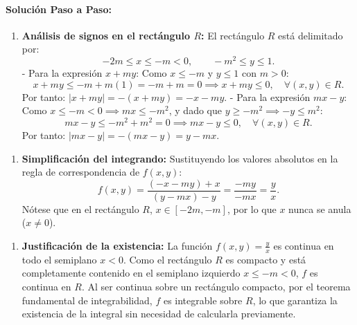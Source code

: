 \documentclass[11pt,a4paper]{article}
\begin{document}
\paragraph{Solución Paso a Paso:}\par
\begin{enumerate}[label=\textbf{\arabic*.}]
\item \textbf{Análisis de signos en el rectángulo $R$:}
El rectángulo $R$ está delimitado por:
\begin{equation*}
-2m \le x \le -m < 0, \qquad -m^2 \le y \le 1.
\end{equation*}
- Para la expresión $x + my$:
Como $x \le -m$ y $y \le 1$ con $m > 0$:
\begin{equation*}
x + my \le -m + m(1) = -m + m = 0 \implies x + my \le 0, \quad \forall (x,y) \in R.
\end{equation*}
Por tanto: $|x + my| = -(x + my) = -x - my$.
- Para la expresión $mx - y$:
Como $x \le -m < 0 \implies mx \le -m^2$, y dado que $y \ge -m^2 \implies -y \le m^2$:
\begin{equation*}
mx - y \le -m^2 + m^2 = 0 \implies mx - y \le 0, \quad \forall (x,y) \in R.
\end{equation*}
Por tanto: $|mx - y| = -(mx - y) = y - mx$.
\end{enumerate}

\begin{enumerate}[label=\textbf{\arabic*.}]
\item \textbf{Simplificación del integrando:}
Sustituyendo los valores absolutos en la regla de correspondencia de $f(x,y)$:
\begin{equation*}
f(x,y) = \frac{(-x - my) + x}{(y - mx) - y} = \frac{-my}{-mx} = \frac{y}{x}.
\end{equation*}
Nótese que en el rectángulo $R$, $x \in [-2m, -m]$, por lo que $x$ nunca se anula ($x \neq 0$).
\end{enumerate}

\begin{enumerate}[label=\textbf{\arabic*.}]
\item \textbf{Justificación de la existencia:}
La función $f(x,y) = \frac{y}{x}$ es continua en todo el semiplano $x < 0$.
Como el rectángulo $R$ es compacto y está completamente contenido en el semiplano izquierdo $x \le -m < 0$, $f$ es continua en $R$.
Al ser continua sobre un rectángulo compacto, por el teorema fundamental de integrabilidad, $f$ es integrable sobre $R$, lo que garantiza la existencia de la integral sin necesidad de calcularla previamente.
\end{enumerate}
\end{document}
